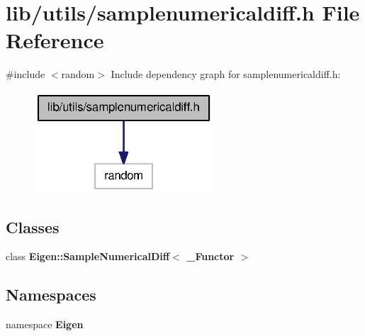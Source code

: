 \section{lib/utils/samplenumericaldiff.h \-File \-Reference}
\label{samplenumericaldiff_8h}
{\ttfamily \#include $<$random$>$}\*
\-Include dependency graph for samplenumericaldiff.\-h\-:\nopagebreak
\begin{figure}[H]
\begin{center}
\leavevmode
\includegraphics[width=190pt]{samplenumericaldiff_8h__incl}
\end{center}
\end{figure}
\subsection*{\-Classes}
\begin{DoxyCompactItemize}
\item 
class {\bf \-Eigen\-::\-Sample\-Numerical\-Diff$<$ \-\_\-\-Functor $>$}
\end{DoxyCompactItemize}
\subsection*{\-Namespaces}
\begin{DoxyCompactItemize}
\item 
namespace {\bf \-Eigen}
\end{DoxyCompactItemize}
